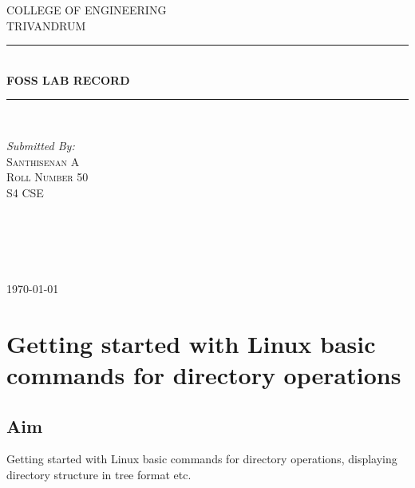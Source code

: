 \documentclass{article}
\begin{document}
\newcommand{\HRule}{\rule{\linewidth}{0.5mm}} 
\begin{titlepage}

\center

\textsc{\LARGE COLLEGE OF ENGINEERING }\\[1.3cm]
\textsc{\Large TRIVANDRUM}\\[0.5cm]

\HRule \\[0.4cm]
{ \huge \bfseries FOSS LAB RECORD}\\[0.4cm] 
\HRule \\[1.5cm]


\begin{minipage}{0.4\textwidth}
\begin{flushleft} \large
\emph{Submitted By:}\\


 \textsc{Santhisenan A \\
 Roll Number 50 \\
 S4 CSE\\
 } 
\end{flushleft}
\end{minipage}
~
\begin{minipage}{0.4\textwidth}
\begin{flushright} \large
\emph{} \\
\end{flushright}
\end{minipage}\\[4cm]


{\large \today}\\[3cm] 


\vfill



\end{titlepage}
\newpage
\tableofcontents{}

\newpage
\section{Getting started with Linux basic commands for directory operations}

\subsection{Aim}
Getting started with Linux basic commands for directory operations, displaying directory structure in tree format etc.
\end{document}
